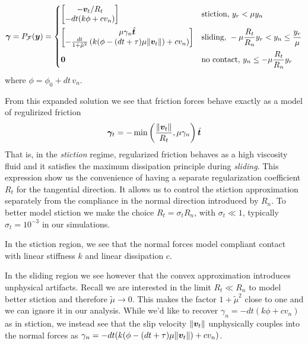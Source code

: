 \begin{equation}
	\bgamma = P_\mathcal{F}(\vf{y}) = 
\begin{dcases}
	\begin{bmatrix}
		-\vf{v}_t/R_t\\
		-dt(k\phi + c v_n)
	\end{bmatrix}
	& \text{stiction, } y_r < \mu y_n\\
	\begin{bmatrix}
		\mu\gamma_n\hat{\vf{t}}\\
		-\frac{dt}{1+\tilde\mu^2}\left(k(\phi-(dt+\tau)\mu\Vert\vf{v}_t\Vert) + cv_n \right)
	\end{bmatrix}
	& \text{sliding, } -\mu \frac{R_t}{R_n} y_r < y_n \leq \frac{y_r}{\mu}\\
    \vf{0} & \text{no contact, } y_n \leq -\mu \frac{R_t}{R_n} y_r
\end{dcases}	  
	\label{eq:gamma_piecewise}
\end{equation}
where $\phi= \phi_0 + dt\,v_n$.

From this expanded solution we see that friction forces behave exactly as a
model of regulirized friction
\begin{equation}
	{\bm\gamma}_t = -\min\left(\frac{\Vert{\bm{v}}_t\Vert}{R_t}, \mu\gamma_n\right)\hat{{\bm{t}}}
\end{equation}
That is, in the \textit{stiction} regime, regularized friction behaves as a high
viscosity fluid and it satisfies the maximum dissipation principle during
\textit{sliding}. This expression show us the convenience of having a separate
regularization coefficient $R_t$ for the tangential direction. It allows us to
control the stiction approximation separately from the compliance in the normal
direction introduced by $R_n$. To better model stiction we make the choice
$R_t=\sigma_t R_n$, with $\sigma_t \ll 1$, typically $\sigma_t=10^{-3}$ in our
simulations.

In the stiction region, we see that the normal forces model compliant contact
with linear stiffness $k$ and linear dissipation $c$. 

In the sliding region we see however that the convex approximation introduces
unphysical artifacts. Recall we are interested in the limit $R_t \ll R_n$ to
model better stiction and therefore $\tilde\mu \rightarrow 0$. This makes the
factor $1+\tilde{\mu}^2$ close to one and we can ignore it in our analysis.
While we'd like to recover $\gamma_n = -dt(k\phi + c v_n)$ as in stiction, we
instead see that the slip velocity $\Vert{\bm{v}}_t\Vert$ unphysically couples
into the normal forces as $\gamma_n=-dt(k(\phi-(dt+\tau)\mu\Vert{\bm{v}}_t\Vert) +
cv_n)$. 

